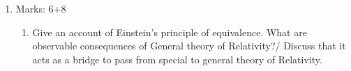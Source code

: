 \documentclass[../main-sheet.tex]{subfiles}
\begin{document}
\begin{enumerate}
\begin{enumerate}
    \end{enumerate}
    \item Marks: 6+8
    \begin{enumerate}
        \item Give an account of Einstein's principle of equivalence. What are observable consequences of General theory of Relativity?/ Discuss that it acts as a bridge to pass from special to general theory of Relativity.


\end{enumerate}
\end{enumerate}
\end{document}
